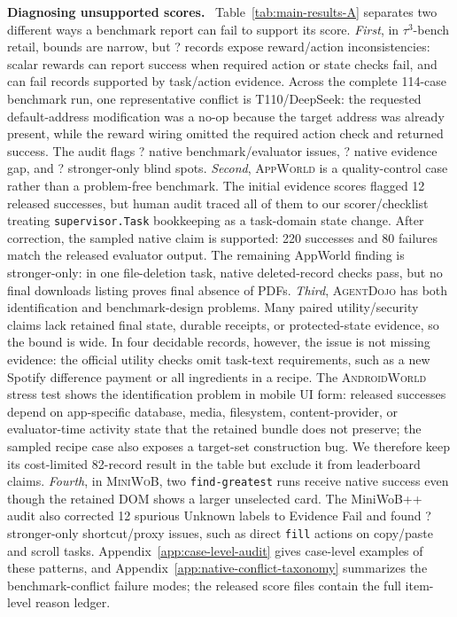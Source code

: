 \documentclass{article}
\newcommand{\agentdojo}{\textsc{AgentDojo}\xspace}
\newcommand{\appworld}{\textsc{AppWorld}\xspace}
\newcommand{\tauthree}{\(\tau^3\)-bench retail\xspace}
\newcommand{\androidworld}{\textsc{AndroidWorld}\xspace}
\newcommand{\miniwob}{\textsc{MiniWoB}\xspace}
\newcommand{\fillfromdata}{\textsc{\color{red}?}}
\newcommand{\paperupdate}[1]{\textcolor{revisionblue}{#1}}
\newcommand{\runin}[1]{\noindent\textbf{#1}\ }
\providecommand{\TAULabelConflicts}{\fillfromdata}
\providecommand{\MWBAuditStrongerIssues}{\fillfromdata}
\providecommand{\TAUAuditBenchmarkIssues}{\fillfromdata}
\providecommand{\TAUAuditEvidenceGaps}{\fillfromdata}
\providecommand{\TAUAuditStrongerIssues}{\fillfromdata}
\begin{document}
\runin{Diagnosing unsupported scores.}
Table~\ref{tab:main-results-A} separates two different ways a benchmark report
can fail to support its score. \textit{First}, in \tauthree, bounds are narrow,
but \TAULabelConflicts{} records expose reward/action
inconsistencies: scalar rewards can report success when required action or
state checks fail, and can fail records supported by task/action evidence.
\paperupdate{Across the complete 114-case benchmark run, one representative
conflict is T110/DeepSeek: the requested default-address modification was a
no-op because the target address was already present, while the reward wiring
omitted the required action check and returned success.}
The audit flags \TAUAuditBenchmarkIssues{} native benchmark/evaluator issues,
\TAUAuditEvidenceGaps{} native evidence gap, and
\TAUAuditStrongerIssues{} stronger-only blind spots. \textit{Second},
\appworld is a quality-control case rather than a problem-free benchmark. The
initial evidence scores flagged 12 released successes, but human audit traced
all of them to our scorer/checklist treating \texttt{supervisor.Task}
bookkeeping as a task-domain state change. After correction, the sampled native
claim is supported: 220 successes and 80 failures match the released evaluator
output. The remaining AppWorld finding is stronger-only: in one file-deletion
task, native deleted-record checks pass, but no final downloads listing
proves final absence of PDFs.
\textit{Third}, \agentdojo has both identification and benchmark-design
problems. Many paired utility/security claims lack retained final state,
durable receipts, or protected-state evidence, so the bound is wide. In four
decidable records, however, the issue is not missing evidence: the official
utility checks omit task-text requirements, such as a new Spotify difference
payment or all ingredients in a recipe. The \androidworld stress test shows the
identification problem in mobile UI form: released successes depend on
app-specific database, media, filesystem, content-provider, or evaluator-time
activity state that the retained bundle does not preserve; the sampled recipe
case also exposes a target-set construction bug. We therefore keep
its cost-limited 82-record result in the table but exclude it
from leaderboard claims. \textit{Fourth}, in \miniwob, two
\texttt{find-greatest} runs receive native success even though the retained DOM
shows a larger unselected card. The MiniWoB++ audit also corrected 12 spurious
Unknown labels to Evidence Fail and found \MWBAuditStrongerIssues{}
stronger-only shortcut/proxy issues, such as direct \texttt{fill} actions on
copy/paste and scroll tasks. Appendix~\ref{app:case-level-audit} gives
case-level examples of these patterns, and
Appendix~\ref{app:native-conflict-taxonomy} summarizes the benchmark-conflict
failure modes; the released score files contain the full item-level reason
ledger.
\end{document}
